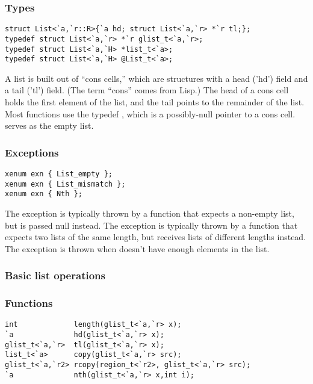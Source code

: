 \subsubsection*{Types}
\begin{verbatim}
struct List<`a,`r::R>{`a hd; struct List<`a,`r> *`r tl;};
typedef struct List<`a,`r> *`r glist_t<`a,`r>;
typedef struct List<`a,`H> *list_t<`a>;
typedef struct List<`a,`H> @List_t<`a>;
\end{verbatim}

A list is built out of ``cons cells,'' which are structures with a
head ('hd') field and a tail ('tl') field.  (The term ``cons'' comes
from Lisp.)  The head of a cons cell holds the first element of the
list, and the tail points to the remainder of the list.  Most
functions use the typedef , which is a possibly-null
pointer to a cons cell.   serves as the empty list.

\subsubsection*{Exceptions}
\begin{verbatim}
xenum exn { List_empty };
xenum exn { List_mismatch };
xenum exn { Nth };
\end{verbatim}

The  exception is typically thrown by a function that
expects a non-empty list, but is passed null instead.  The
 exception is typically thrown by a function that
expects two lists of the same length, but receives lists of different
lengths instead.  The  exception is thrown when
 doesn't have enough elements in the list.

\subsubsection*{Basic list operations}
\subsubsection*{Functions}
\begin{verbatim}
int             length(glist_t<`a,`r> x);
`a              hd(glist_t<`a,`r> x);
glist_t<`a,`r>  tl(glist_t<`a,`r> x);
list_t<`a>      copy(glist_t<`a,`r> src);
glist_t<`a,`r2> rcopy(region_t<`r2>, glist_t<`a,`r> src);
`a              nth(glist_t<`a,`r> x,int i);
\end{verbatim}

